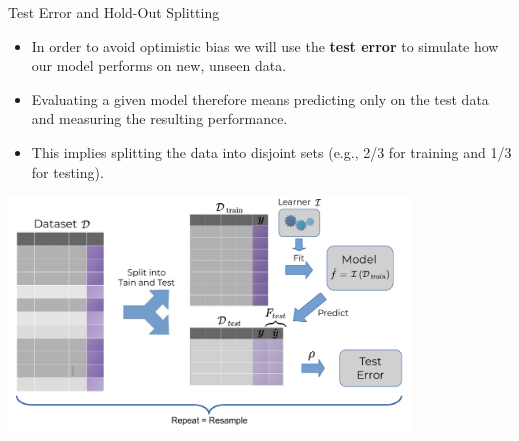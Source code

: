 \documentclass[11pt,compress,t,notes=noshow, xcolor=table]{beamer}
\begin{document}
\begin{vbframe}{Test Error and Hold-Out Splitting}


\begin{itemize}
  \item In order to avoid optimistic bias we will use the 
  \textbf{test error} to simulate how our model performs on new, unseen data.
  \item Evaluating a given model therefore means predicting only on the
  test data and measuring the resulting performance.
  \item This implies splitting the data into disjoint sets (e.g., 2/3 for 
  training and 1/3 for testing).
\end{itemize}

\begin{center}
  \includegraphics[width=0.8\textwidth]{figure_man/test_error.pdf}
\end{center}

\end{vbframe}
\end{document}
